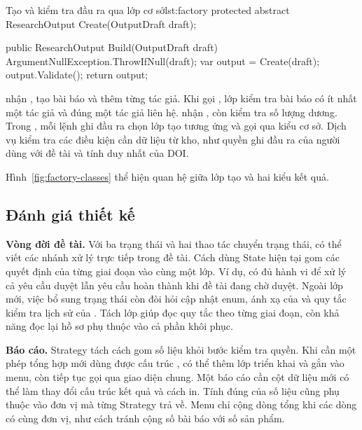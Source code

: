 \begin{ReportCode}[firstnumber=17,gobble=4]{Tạo và kiểm tra đầu ra qua lớp cơ sở}{lst:factory}
    protected abstract ResearchOutput Create(OutputDraft draft);

    public ResearchOutput Build(OutputDraft draft)
    {
        ArgumentNullException.ThrowIfNull(draft);
        var output = Create(draft);
        output.Validate();
        return output;
    }
\end{ReportCode}

 nhận , tạo bài báo và thêm từng tác giả. Khi  gọi , lớp  kiểm tra bài báo có ít nhất một tác giả và đúng một tác giả liên hệ.  nhận , còn  kiểm tra số lượng dương. Trong , mỗi lệnh ghi đầu ra chọn lớp tạo tương ứng và gọi  qua kiểu cơ sở. Dịch vụ kiểm tra các điều kiện cần dữ liệu từ kho, như quyền ghi đầu ra của người dùng với đề tài và tính duy nhất của DOI.

Hình~\ref{fig:factory-classes} thể hiện quan hệ giữa lớp tạo và hai kiểu kết quả.

\subsection{Đánh giá thiết kế}\label{sec:design-review}

\textbf{Vòng đời đề tài.} Với ba trạng thái và hai thao tác chuyển trạng thái, có thể viết các nhánh xử lý trực tiếp trong đề tài. Cách dùng State hiện tại gom các quyết định của từng giai đoạn vào cùng một lớp. Ví dụ,  có đủ hành vi để xử lý cả yêu cầu duyệt lẫn yêu cầu hoàn thành khi đề tài đang chờ duyệt. Ngoài lớp mới, việc bổ sung trạng thái còn đòi hỏi cập nhật enum, ánh xạ của  và quy tắc kiểm tra lịch sử của . Tách lớp giúp đọc quy tắc theo từng giai đoạn, còn khả năng đọc lại hồ sơ phụ thuộc vào cả phần khôi phục.

\textbf{Báo cáo.} Strategy tách cách gom số liệu khỏi bước kiểm tra quyền. Khi cần một phép tổng hợp mới dùng được cấu trúc , có thể thêm lớp triển khai  và gắn vào menu, còn  tiếp tục gọi qua giao diện chung. Một báo cáo cần cột dữ liệu mới có thể làm thay đổi cấu trúc kết quả và cách in. Tính đúng của số liệu cũng phụ thuộc vào đơn vị mà từng Strategy trả về. Menu chỉ cộng dòng tổng khi các dòng có cùng đơn vị, như cách tránh cộng số bài báo với số sản phẩm.

